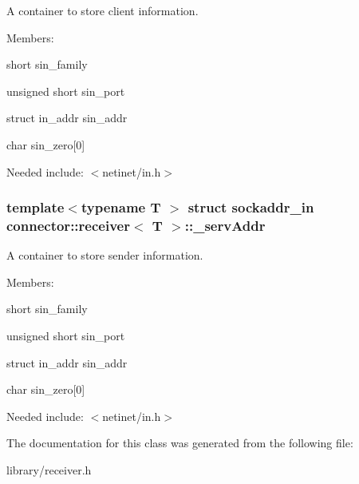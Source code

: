A container to store client information. 

Members\+:
\begin{DoxyItemize}
\item {\ttfamily short} sin\+\_\+family
\item {\ttfamily unsigned short} sin\+\_\+port
\item {\ttfamily struct} in\+\_\+addr sin\+\_\+addr
\item {\ttfamily char} sin\+\_\+zero\mbox{[}0\mbox{]}
\end{DoxyItemize}

Needed include\+: {\ttfamily $<$netinet/in.\+h$>$} 
\subsubsection[{\texorpdfstring{\+\_\+serv\+Addr}{_servAddr}}]{\setlength{\rightskip}{0pt plus 5cm}template$<$typename T $>$ struct sockaddr\+\_\+in {\bf connector\+::receiver}$<$ T $>$\+::\+\_\+serv\+Addr\hspace{0.3cm}{\ttfamily [private]}}\hypertarget{classconnector_1_1receiver_a60b325418fa641caf8a707b02f844dab}{}\label{classconnector_1_1receiver_a60b325418fa641caf8a707b02f844dab}


A container to store sender information. 

Members\+:
\begin{DoxyItemize}
\item {\ttfamily short} sin\+\_\+family
\item {\ttfamily unsigned short} sin\+\_\+port
\item {\ttfamily struct} in\+\_\+addr sin\+\_\+addr
\item {\ttfamily char} sin\+\_\+zero\mbox{[}0\mbox{]}
\end{DoxyItemize}

Needed include\+: {\ttfamily $<$netinet/in.\+h$>$} 

The documentation for this class was generated from the following file\+:\begin{DoxyCompactItemize}
\item 
library/receiver.\+h\end{DoxyCompactItemize}
